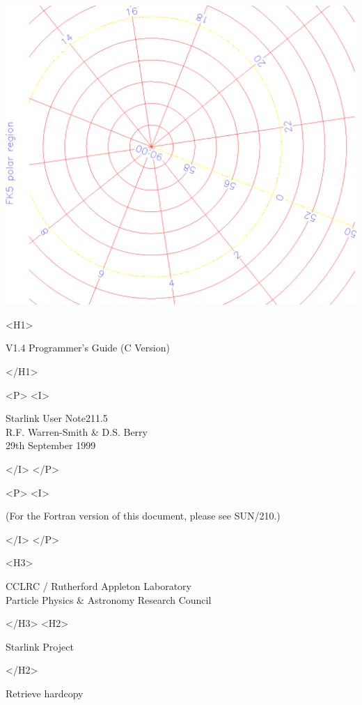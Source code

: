 \documentclass[twoside,11pt]{article}
\newcommand{\stardoccategory}  {Starlink User Note}
\newcommand{\stardocsource}    {sun\stardocnumber}
\newcommand{\stardocnumber}    {211.5}
\newcommand{\stardocauthors}   {R.F. Warren-Smith \& D.S. Berry}
\newcommand{\stardocdate}      {29th September 1999}
\newcommand{\stardocversion}   {V1.4}
\newcommand{\stardocmanualhtml}{Programmer's Guide (C Version)}
\newcommand{\htmladdnormallink}[2]{#1}
\newcommand{\htmladdimg}[1]{}
\newcommand{\xref}[3]{#1}
\begin{document}
\begin{htmlonly}
   \includegraphics[scale=0.3,angle=-90]{sun211_figures/frontc.eps}

   \begin{rawhtml} <H1> \end{rawhtml}
      \stardocversion
      \stardocmanualhtml
   \begin{rawhtml} </H1> \end{rawhtml}
   \begin{rawhtml} <P> <I> \end{rawhtml}
   \stardoccategory \stardocnumber \\
   \stardocauthors \\
   \stardocdate
   \begin{rawhtml} </I> </P> \end{rawhtml}
   \begin{rawhtml} <P> <I> \end{rawhtml}
   (For the Fortran version of this document, please see
    \xref{SUN/210}{sun210}{}.)
   \begin{rawhtml} </I> </P> \end{rawhtml}
   \begin{rawhtml} <H3> \end{rawhtml}
      \htmladdnormallink{CCLRC}{http://www.cclrc.ac.uk} /
      \htmladdnormallink{Rutherford Appleton Laboratory}
                        {http://www.cclrc.ac.uk/ral} \\
      \htmladdnormallink{Particle Physics \& Astronomy Research Council}
                        {http://www.pparc.ac.uk} \\
   \begin{rawhtml} </H3> <H2> \end{rawhtml}
      \htmladdnormallink{Starlink Project}{http://www.starlink.rl.ac.uk/}
   \begin{rawhtml} </H2> \end{rawhtml}
   \htmladdnormallink{\htmladdimg{source.gif} Retrieve hardcopy}
      {http://www.starlink.rl.ac.uk/cgi-bin/hcserver?\stardocsource}\\


\end{htmlonly}
\end{document}

